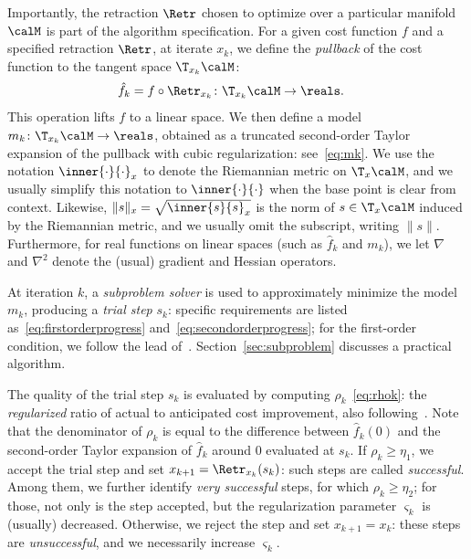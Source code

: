 Importantly, the retraction $\Retr$ chosen to optimize over a particular manifold $\calM$ is part of the algorithm specification. For a given cost function $f$ and a specified retraction $\Retr$, at iterate $x_k$, we define the \emph{pullback} of the cost function to the tangent space $\T_{x_k}\calM$:
\begin{align}
	\hat f_k & = f \circ \Retr_{x_k} \colon \T_{x_k}\calM \to \reals.
	\label{eq:fhatk}
\end{align}
This operation lifts $f$ to a linear space.
We then define a model $m_k \colon \T_{x_k}\calM \to \reals$, obtained as a truncated second-order Taylor expansion of the pullback with cubic regularization: see~\eqref{eq:mk}. We use the notation $\inner{\cdot}{\cdot}_x$ to denote the Riemannian metric on $\T_x\calM$, and we usually simplify this notation to $\inner{\cdot}{\cdot}$ when the base point is clear from context. Likewise, $\|s\|_x = \sqrt{\inner{s}{s}_x}$ is the norm of $s \in \T_x\calM$ induced by the Riemannian metric, and we usually omit the subscript, writing $\|s\|$.
Furthermore, for real functions on linear spaces (such as $\hat f_k$ and $m_k$), we let $\nabla$ and $\nabla^2$ denote the (usual) gradient and Hessian operators.

At iteration $k$, a \emph{subproblem solver} is used to approximately minimize the model $m_k$, producing a \emph{trial step} $s_k$: specific requirements are listed as~\eqref{eq:firstorderprogress} and~\eqref{eq:secondorderprogress}; for the first-order condition, we follow the lead of~\citet{bcgmt}. Section~\ref{sec:subproblem} discusses a practical algorithm.

The quality of the trial step $s_k$ is evaluated by computing $\rho_k$~\eqref{eq:rhok}: the \emph{regularized} ratio of actual to anticipated cost improvement, also following~\citet{bcgmt}. Note that the denominator of $\rho_k$ is equal to the difference between $\hat f_k(0)$ and the second-order Taylor expansion of $\hat f_k$ around 0 evaluated at $s_k$.
If $\rho_k \geq \eta_1$, we accept the trial step and set $x_{k+1} = \Retr_{x_k}(s_k)$: such steps are called \emph{successful}.
Among them, we further identify \emph{very successful} steps, for which $\rho_k \geq \eta_2$; for those, not only is the step accepted, but the regularization parameter $\varsigma_k$ is (usually) decreased.
Otherwise, we reject the step and set $x_{k+1} = x_k$: these steps are \emph{unsuccessful}, and we necessarily increase $\varsigma_k$.

